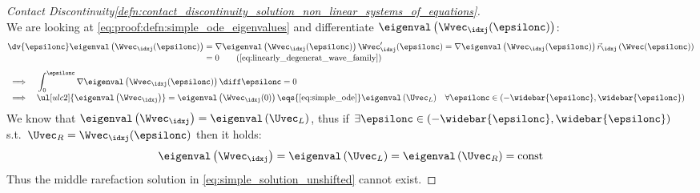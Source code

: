 \begin{proofbox}\nospacing
    \begin{proof}[Contact Discontinuity\cref{defn:contact_discontinuity_solution_non_linear_systems_of_equations}]\label{proof:contact_discontinuity}\leavevmode\\
        We are looking at \cref{eq:proof:defn:simple_ode_eigenvalues} and differentiate $\eigenval \left(\Wvec_{\idxj}(\epsilonc)\right)$:
        \begin{align*}
          \dv{\epsilonc}\eigenval \left(\Wvec_{\idxj}(\epsilonc)\right)&=\nabla\eigenval \left(\Wvec_{\idxj}(\epsilonc)\right)\Wvec_{\idxj}'(\epsilonc)
          =\nabla\eigenval \left(\Wvec_{\idxj}(\epsilonc)\right)\vec{r}_{\idxj}\left(\Wvec(\epsilonc)\right)\\[-1\jot]
          &=0\qquad (\text{\cref{eq:linearly_degenerat_wave_family}})
        \end{align*}
        \begin{align*}
          &\implies&&\int_{0}^{\epsilonc}\nabla\eigenval\left(\Wvec_{\idxj}(\epsilonc)\right)\diff\epsilonc=0 \\[-1\jot]
          &\implies&&\ul[ulc2]{\eigenval\left(\Wvec_{\idxj}\right)}=\eigenval\left(\Wvec_{\idxj}(0)\right)\eqs{{\text{\cref{eq:simple_ode}}}}\eigenval\left(\Uvec_{L}\right)
                      &&\forall\epsilonc\in(-\widebar{\epsilonc},\widebar{\epsilonc})
        \end{align*}
        We know that $\eigenval\left(\Wvec_{\idxj}\right)=\eigenval\left(\Uvec_{L}\right)$, thus if $\exists\epsilonc\in(-\widebar{\epsilonc},\widebar{\epsilonc})$
        s.t.\ $\Uvec_{R}=\Wvec_{\idxj}(\epsilonc)$ then it holds:
        \begin{align*}
          \eigenval\left(\Wvec_{\idxj}\right)=\eigenval\left(\Uvec_{L}\right)=\eigenval\left(\Uvec_{R}\right)=\text{const}
        \end{align*}
        Thus the middle rarefaction solution in \cref{eq:simple_solution_unshifted} cannot exist.
    \end{proof}
\end{proofbox}
